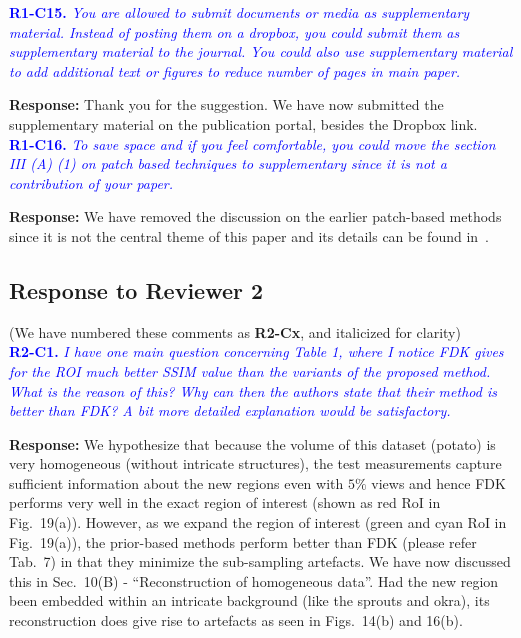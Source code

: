 \documentclass{article}
\begin{document}
\textcolor{blue}{\textbf{R1-C15.}\textit{ You are allowed to submit documents or media as supplementary material. Instead of posting them on a dropbox, you could submit them as supplementary material to the journal. You could also use supplementary material to add additional text or figures to reduce number of pages in main paper.}}
    
\textbf{Response:} Thank you for the suggestion. We have now submitted the supplementary material  on the publication portal, besides the Dropbox link. \\

\textcolor{blue}{\textbf{R1-C16.}\textit{ To save space and if you feel comfortable, you could move the section III (A) (1) on patch based techniques to supplementary since it is not a contribution of your paper.}}
    
\textbf{Response:} We have removed the discussion on the earlier patch-based methods since it is not the central theme of this paper and its details can be found in~\cite{my_dicta_paper}.

\subsection{Response to Reviewer 2}
(We have numbered these comments as \textbf{R2-Cx}, and italicized for clarity)\\

\textcolor{blue}{\textbf{R2-C1.}\textit{ I have one main question concerning Table 1, where I notice FDK gives for the ROI much better SSIM value than the variants of the proposed method. What is the reason of this? Why can then the authors state that their method is better than FDK? A bit more detailed explanation would be satisfactory.}}

\textbf{Response:} We hypothesize that because the volume of this dataset (potato) is very homogeneous (without intricate  structures), the test measurements capture sufficient information about the new regions even with $5\%$ views and hence FDK performs very well in the exact region of interest (shown as red RoI in Fig.~19(a)). However, as we expand the region of interest (green and cyan RoI in Fig.~19(a)), the prior-based methods perform better than FDK (please refer Tab.~7) in that they minimize the sub-sampling artefacts.  We have now discussed this in Sec.~10(B) - ``Reconstruction of homogeneous data''.
Had the new region been embedded within an intricate background (like the sprouts and okra), its reconstruction does give rise to artefacts as seen in Figs.~14(b) and 16(b). \\
\end{document}
